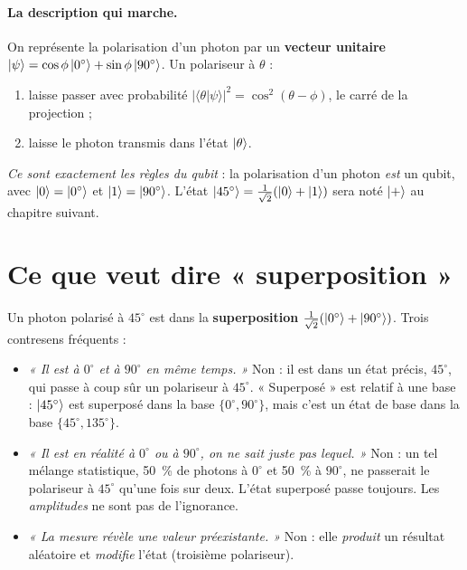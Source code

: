 \paragraph{La description qui marche.} On représente la polarisation d'un photon par un \textbf{vecteur unitaire} $\lvert \psi\rangle=\cos\phi\,\lvert 0^\circ\rangle+\sin\phi\,\lvert 90^\circ\rangle$. Un polariseur à $\theta$ :
\begin{enumerate}
\item laisse passer avec probabilité $|\langle\theta|\psi\rangle|^2=\cos^2(\theta-\phi)$, le carré de la projection ;
\item laisse le photon transmis dans l'état $\lvert \theta\rangle$.
\end{enumerate}
\emph{Ce sont exactement les règles du qubit} : la polarisation d'un photon \emph{est} un qubit, avec $\lvert 0\rangle=\lvert 0^\circ\rangle$ et $\lvert 1\rangle=\lvert 90^\circ\rangle$. L'état $\lvert 45^\circ\rangle=\tfrac1{\sqrt2}(\lvert 0\rangle+\lvert 1\rangle)$ sera noté $\lvert +\rangle$ au chapitre suivant.

\section{Ce que veut dire « superposition »}
Un photon polarisé à $45^\circ$ est dans la \textbf{superposition} $\tfrac1{\sqrt2}(\lvert 0^\circ\rangle+\lvert 90^\circ\rangle)$. Trois contresens fréquents :
\begin{itemize}
\item \emph{« Il est à $0^\circ$ et à $90^\circ$ en même temps. »} Non : il est dans un état précis, $45^\circ$, qui passe à coup sûr un polariseur à $45^\circ$. « Superposé » est relatif à une base : $\lvert 45^\circ\rangle$ est superposé dans la base $\{0^\circ,90^\circ\}$, mais c'est un état de base dans la base $\{45^\circ,135^\circ\}$.
\item \emph{« Il est en réalité à $0^\circ$ ou à $90^\circ$, on ne sait juste pas lequel. »} Non : un tel mélange statistique, 50~\% de photons à $0^\circ$ et 50~\% à $90^\circ$, ne passerait le polariseur à $45^\circ$ qu'une fois sur deux. L'état superposé passe toujours. Les \emph{amplitudes} ne sont pas de l'ignorance.
\item \emph{« La mesure révèle une valeur préexistante. »} Non : elle \emph{produit} un résultat aléatoire et \emph{modifie} l'état (troisième polariseur).
\end{itemize}

